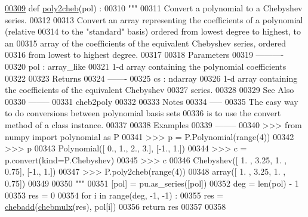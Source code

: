 \begin{DoxyCode}
\hypertarget{namespacepyneb_1_1utils_1_1chebyshev_l00309}{}\hyperlink{namespacepyneb_1_1utils_1_1chebyshev_a1f91018c86380adf38318e4e224279e7}{00309} \textcolor{keyword}{def }\hyperlink{namespacepyneb_1_1utils_1_1chebyshev_a1f91018c86380adf38318e4e224279e7}{poly2cheb}(pol) :
00310     \textcolor{stringliteral}{"""}
00311 \textcolor{stringliteral}{    Convert a polynomial to a Chebyshev series.}
00312 \textcolor{stringliteral}{}
00313 \textcolor{stringliteral}{    Convert an array representing the coefficients of a polynomial (relative}
00314 \textcolor{stringliteral}{    to the "standard" basis) ordered from lowest degree to highest, to an}
00315 \textcolor{stringliteral}{    array of the coefficients of the equivalent Chebyshev series, ordered}
00316 \textcolor{stringliteral}{    from lowest to highest degree.}
00317 \textcolor{stringliteral}{}
00318 \textcolor{stringliteral}{    Parameters}
00319 \textcolor{stringliteral}{    ----------}
00320 \textcolor{stringliteral}{    pol : array\_like}
00321 \textcolor{stringliteral}{        1-d array containing the polynomial coefficients}
00322 \textcolor{stringliteral}{}
00323 \textcolor{stringliteral}{    Returns}
00324 \textcolor{stringliteral}{    -------}
00325 \textcolor{stringliteral}{    cs : ndarray}
00326 \textcolor{stringliteral}{        1-d array containing the coefficients of the equivalent Chebyshev}
00327 \textcolor{stringliteral}{        series.}
00328 \textcolor{stringliteral}{}
00329 \textcolor{stringliteral}{    See Also}
00330 \textcolor{stringliteral}{    --------}
00331 \textcolor{stringliteral}{    cheb2poly}
00332 \textcolor{stringliteral}{}
00333 \textcolor{stringliteral}{    Notes}
00334 \textcolor{stringliteral}{    -----}
00335 \textcolor{stringliteral}{    The easy way to do conversions between polynomial basis sets}
00336 \textcolor{stringliteral}{    is to use the convert method of a class instance.}
00337 \textcolor{stringliteral}{}
00338 \textcolor{stringliteral}{    Examples}
00339 \textcolor{stringliteral}{    --------}
00340 \textcolor{stringliteral}{    >>> from numpy import polynomial as P}
00341 \textcolor{stringliteral}{    >>> p = P.Polynomial(range(4))}
00342 \textcolor{stringliteral}{    >>> p}
00343 \textcolor{stringliteral}{    Polynomial([ 0.,  1.,  2.,  3.], [-1.,  1.])}
00344 \textcolor{stringliteral}{    >>> c = p.convert(kind=P.Chebyshev)}
00345 \textcolor{stringliteral}{    >>> c}
00346 \textcolor{stringliteral}{    Chebyshev([ 1.  ,  3.25,  1.  ,  0.75], [-1.,  1.])}
00347 \textcolor{stringliteral}{    >>> P.poly2cheb(range(4))}
00348 \textcolor{stringliteral}{    array([ 1.  ,  3.25,  1.  ,  0.75])}
00349 \textcolor{stringliteral}{}
00350 \textcolor{stringliteral}{    """}
00351     [pol] = pu.as\_series([pol])
00352     deg = len(pol) - 1
00353     res = 0
00354     \textcolor{keywordflow}{for} i \textcolor{keywordflow}{in} range(deg, -1, -1) :
00355         res = \hyperlink{namespacepyneb_1_1utils_1_1chebyshev_a06a85eb72ae35925336a6b550dec3f02}{chebadd}(\hyperlink{namespacepyneb_1_1utils_1_1chebyshev_ab09f8accee50bd964e03071a659a7b5f}{chebmulx}(res), pol[i])
00356     \textcolor{keywordflow}{return} res
00357 
00358 
\end{DoxyCode}


